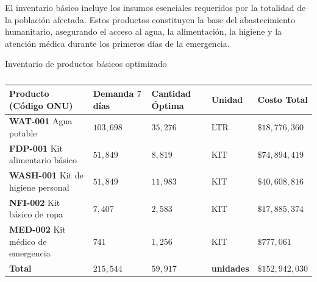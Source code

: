 \documentclass[
  spanish,
  us-letterpaper,
  DIV=11,
  numbers=noendperiod]{scrreprt}
\numberwithin{equation}{section}
\begin{document}
El inventario básico incluye los insumos esenciales requeridos por la
totalidad de la población afectada. Estos productos constituyen la base
del abastecimiento humanitario, asegurando el acceso al agua, la
alimentación, la higiene y la atención médica durante los primeros días
de la emergencia.

Inventario de productos básicos optimizado

\begin{longtable}[]{@{}
  >{\centering\arraybackslash}p{}
  >{\centering\arraybackslash}p{}
  >{\centering\arraybackslash}p{}
  >{\centering\arraybackslash}p{}
  >{\centering\arraybackslash}p{}@{}}

\caption{\label{tbl-inventario-basico}}

\tabularnewline

\toprule\noalign{}
\begin{minipage}[b]{\linewidth}\centering
\textbf{Producto (Código ONU)}
\end{minipage} & \begin{minipage}[b]{\linewidth}\centering
\textbf{Demanda \(7\) días}
\end{minipage} & \begin{minipage}[b]{\linewidth}\centering
\textbf{Cantidad Óptima}
\end{minipage} & \begin{minipage}[b]{\linewidth}\centering
\textbf{Unidad}
\end{minipage} & \begin{minipage}[b]{\linewidth}\centering
\textbf{Costo Total}
\end{minipage} \\
\midrule\noalign{}
\endhead
\bottomrule\noalign{}
\endlastfoot
\textbf{WAT-001} Agua potable & \(103,698\) & \(35,276\) & LTR &
\(\$18,776,360\) \\
\textbf{FDP-001} Kit alimentario básico & \(51,849\) & \(8,819\) & KIT &
\(\$74,894,419\) \\
\textbf{WASH-001} Kit de higiene personal & \(51,849\) & \(11,983\) &
KIT & \(\$40,608,816\) \\
\textbf{NFI-002} Kit básico de ropa & \(7,407\) & \(2,583\) & KIT &
\(\$17,885,374\) \\
\textbf{MED-002} Kit médico de emergencia & \(741\) & \(1,256\) & KIT &
\(\$777,061\) \\
\textbf{Total} & \textbf{\(215,544\)} & \textbf{\(59,917\)} &
\textbf{unidades} & \textbf{\(\$152,942,030\)} \\

\end{longtable}
\end{document}
